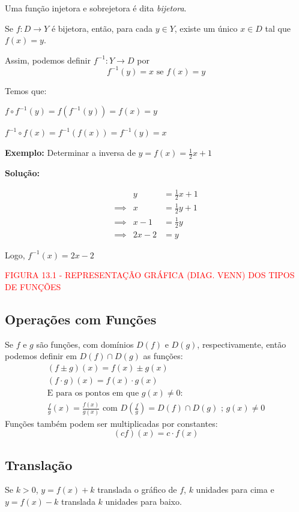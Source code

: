 \documentclass[oneside,a4paper,12pt]{article}
\begin{document}
Uma função injetora e sobrejetora é dita {\it bijetora}.

Se $f: D \rightarrow Y$ é bijetora, então, para cada $y \in Y$, existe um único $x \in D$ tal que $f(x)=y$.

Assim, podemos definir $f^{-1}:Y \rightarrow D$ por 
$$f^{-1}(y) = x \text{ se } f(x) = y$$

Temos que:

$f \circ f^{-1}(y) = f(f^{-1}(y)) = f(x) = y$ 

$f^{-1} \circ f(x) = f^{-1}(f(x)) = f^{-1}(y) = x $

\textbf{Exemplo: } Determinar a inversa de $y = f(x) = \displaystyle \frac{1}{2}x + 1$

{\bf Solução:}

\begin{eqnarray*}
	&  y & = \displaystyle \frac{1}{2}x + 1  \\
	\implies & x & = \displaystyle \frac{1}{2}y + 1 \\
	\implies & x - 1 & = \displaystyle \frac{1}{2}y \\
	\implies & 2x - 2 & = y 
\end{eqnarray*}

Logo, $f^{-1}(x) = 2x - 2$



\begin{center}
	\textcolor{red}{FIGURA 13.1 - REPRESENTAÇÃO GRÁFICA (DIAG. VENN) DOS TIPOS DE FUNÇÕES}
\end{center}

\subsection{Operações com Funções}

Se $f$ e $g$ são funções, com domínios $D(f)$ e $D(g)$, respectivamente, então podemos definir em $D(f) \cap D(g)$ as funções:
\begin{eqnarray*}
(f \pm g)(x) = f(x) \pm g(x) \\
(f \cdot g)(x) = f(x) \cdot g(x) \\
\text{E para os pontos em que $g(x) \neq 0$: } \\
\frac{f}{g}(x) = \frac{f(x)}{g(x)} \text{ com $D(\frac{f}{g}) = D(f) \cap D(g)$ ; $g(x) \neq 0$}
\end{eqnarray*}
Funções também podem ser multiplicadas por constantes: $$(cf)(x) = c \cdot f(x)$$

\subsection{Translação}
Se $k > 0$, $y = f(x) + k$ translada o gráfico de $f$, $k$ unidades para cima e $y = f(x) - k$ translada $k$ unidades para baixo.
\end{document}
